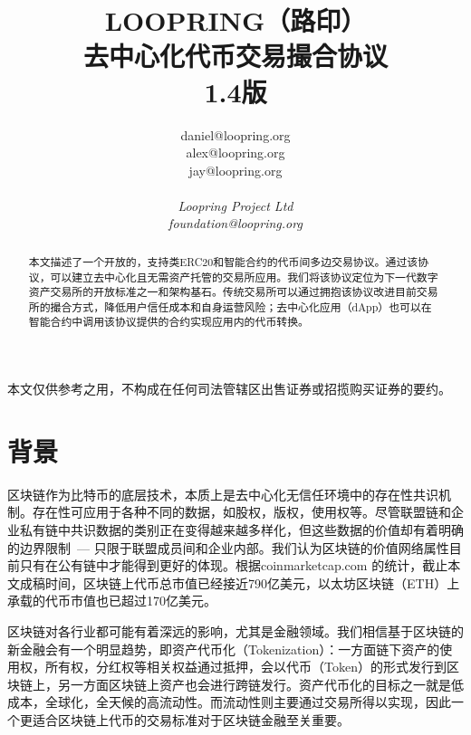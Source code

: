 \documentclass[UTF8,nofonts]{ctexart}
\title{\textbf{LOOPRING（路印）}\\\textbf{去中心化代币交易撮合协议}\\1.4版}
\author{
    daniel@loopring.org\\
    alex@loopring.org\\
    jay@loopring.org\\
    \\
  \textit{Loopring Project Ltd}\\
  \textit{foundation@loopring.org}\\
}
\begin{document}
\maketitle

本文仅供参考之用，不构成在任何司法管辖区出售证券或招揽购买证券的要约。 

\begin{abstract}
本文描述了一个开放的，支持类ERC20和智能合约的代币间多边交易协议。通过该协议，可以建立去中心化且无需资产托管的交易所应用。我们将该协议定位为下一代数字资产交易所的开放标准之一和架构基石。传统交易所可以通过拥抱该协议改进目前交易所的撮合方式，降低用户信任成本和自身运营风险；去中心化应用（dApp）也可以在智能合约中调用该协议提供的合约实现应用内的代币转换。

\end{abstract}

\newpage

\tableofcontents
\newpage

\section{背景\label{sec:background}}

区块链\cite{staff2016blockchains}\cite{swan2015blockchain}作为比特币\cite{nakamoto2008bitcoin}的底层技术，本质上是去中心化无信任环境中的存在性共识机制\cite{lamport1982byzantine}\cite{christidis2016blockchains}。存在性可应用于各种不同的数据，如股权，版权，使用权等。尽管联盟链和企业私有链中共识数据的类别正在变得越来越多样化，但这些数据的价值却有着明确的边界限制\ --- 只限于联盟成员间和企业内部。我们认为区块链的价值网络属性目前只有在公有链中才能得到更好的体现。根据coinmarketcap.com 的统计，截止本文成稿时间，区块链上代币总市值已经接近790亿美元，以太坊区块链\cite{wood2014ethereum}（ETH）上承载的代币市值也已超过170亿美元。

区块链对各行业都可能有着深远的影响，尤其是金融领域。我们相信基于区块链的新金融会有一个明显趋势，即资产代币化（Tokenization）\cite{liu2016medical}\cite{christidis2016blockchains}：一方面链下资产的使用权，所有权，分红权等相关权益通过抵押，会以代币（Token）\cite{swan2015blockchain}的形式发行到区块链上，另一方面区块链上资产也会进行跨链发行。资产代币化的目标之一就是低成本，全球化，全天候的高流动性。而流动性则主要通过交易所得以实现，因此一个更适合区块链上代币的交易标准对于区块链金融至关重要。
\end{document}
